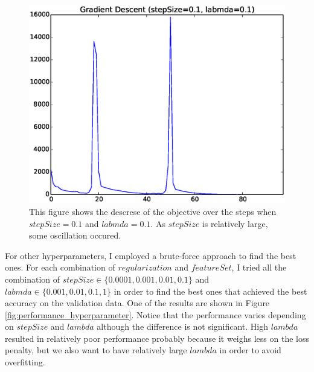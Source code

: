 \begin{figure}[hbtp]
\centering
\includegraphics[width=120mm]{gradient_descent_oscillation}
\caption{This figure shows the descrese of the objective over the steps when $stepSize=0.1$ and $labmda=0.1$. As $stepSize$ is relatively large, some oscillation occured.}
\label{fig:gradient_descent_oscillation}
\end{figure}

For other hyperparameters, I employed a brute-force approach to find the best ones. For each combination of $regularization$ and $featureSet$, I tried all the combination of $stepSize \in \{0.0001, 0.001, 0.01, 0.1\}$ and $labmda \in \{0.001, 0.01, 0.1, 1\}$ in order to find the best ones that achieved the best accuracy on the validation data. One of the results are shown in Figure \ref{fig:performance_hyperparameter}. Notice that the performance varies depending on $stepSize$ and $lambda$ although the difference is not significant. High $lambda$ resulted in relatively poor performance probably because it weighs less on the loss penalty, but we also want to have relatively large $lambda$ in order to avoid overfitting.

